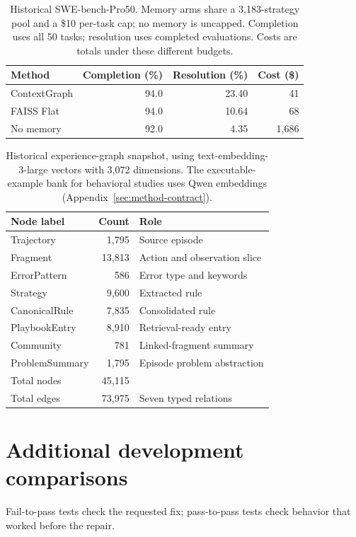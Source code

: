 \begin{table}[htbp]
\centering
\caption{Historical SWE-bench-Pro50. Memory arms share a 3,183-strategy pool
and a \$10 per-task cap; no memory is uncapped. Completion uses all 50 tasks;
resolution uses completed evaluations. Costs are totals under these
different budgets.}
\label{tab:pro50}
\begin{tabular}{lrrr}
\toprule
Method & Completion (\%) & Resolution (\%) & Cost (\$) \\
\midrule
ContextGraph & 94.0 & 23.40 & 41 \\
FAISS Flat & 94.0 & 10.64 & 68 \\
No memory & 92.0 & 4.35 & 1,686 \\
\bottomrule
\end{tabular}
\end{table}

\begin{table}[htbp]
\centering
\caption{Historical experience-graph snapshot, using text-embedding-3-large
vectors with 3,072 dimensions. The executable-example bank for behavioral
studies uses Qwen embeddings (Appendix~\ref{sec:method-contract}).}
\label{tab:schema}
\begin{tabular}{lrl}
\toprule
Node label & Count & Role \\
\midrule
Trajectory & 1,795 & Source episode \\
Fragment & 13,813 & Action and observation slice \\
ErrorPattern & 586 & Error type and keywords \\
Strategy & 9,600 & Extracted rule \\
CanonicalRule & 7,835 & Consolidated rule \\
PlaybookEntry & 8,910 & Retrieval-ready entry \\
Community & 781 & Linked-fragment summary \\
ProblemSummary & 1,795 & Episode problem abstraction \\
\midrule
Total nodes & 45,115 & \\
Total edges & 73,975 & Seven typed relations \\
\bottomrule
\end{tabular}
\end{table}

\clearpage
\section{Additional development comparisons}
\label{sec:additional}
Fail-to-pass tests check the requested fix; pass-to-pass tests check behavior
that worked before the repair.

